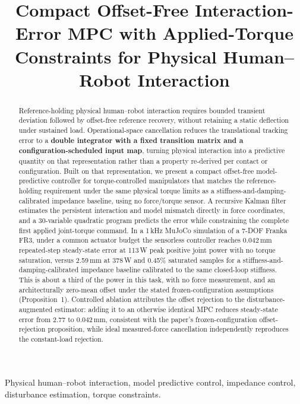 \documentclass[conference]{IEEEtran}
\begin{document}
\title{Compact Offset-Free Interaction-Error MPC with Applied-Torque Constraints 
for Physical Human--Robot 
Interaction}
\author{}
\maketitle

\begin{abstract}
Reference-holding physical human--robot interaction requires bounded
transient deviation followed by offset-free reference recovery, without
retaining a static deflection under sustained load. Operational-space
cancellation reduces the translational tracking error to a
\textbf{double integrator with a fixed transition matrix and a
configuration-scheduled input map}, turning physical interaction into a
predictive quantity on that representation rather than a property
re-derived per contact or configuration. Built on that representation, we present a compact
offset-free model-predictive controller for torque-controlled
manipulators that matches the reference-holding requirement under the same
physical torque limits as a stiffness-and-damping-calibrated
impedance baseline, using no force/torque sensor. A recursive Kalman
filter estimates the persistent interaction and model mismatch directly
in force coordinates, and a 30-variable quadratic program predicts the
error while constraining the complete first applied joint-torque
command. In a 1\,kHz
MuJoCo simulation of a 7-DOF Franka FR3, under a common actuator budget the
sensorless controller reaches 0.042\,mm repeated-step steady-state error at
113\,W peak positive joint power with no torque saturation, versus 2.59\,mm
at 378\,W and 0.45\% saturated samples for a stiffness-and-damping-calibrated
impedance
baseline calibrated to the same closed-loop stiffness. This is about a
third of the power in this task, with no force measurement, and an
architecturally zero-mean offset under the stated frozen-configuration
assumptions (Proposition~1). Controlled
ablation attributes the offset rejection to the disturbance-augmented
estimator: adding it to an otherwise identical MPC reduces steady-state
error from 2.77 to 0.042\,mm, consistent with the paper's frozen-configuration
offset-rejection proposition, while ideal measured-force cancellation
independently reproduces the constant-load rejection.
\end{abstract}

\begin{IEEEkeywords}
Physical human--robot interaction, model predictive control, impedance
control, disturbance estimation, torque constraints.
\end{IEEEkeywords}
\end{document}

